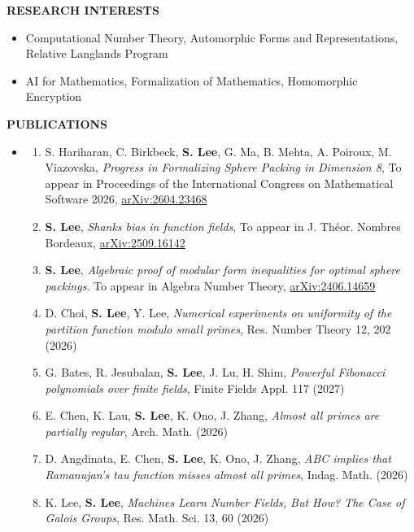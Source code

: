 \documentclass[letterpaper,11pt]{article}
\newcommand{\resheading}[1]{%
  \par\addvspace{10pt}%
  {\sffamily\bfseries\large\color{accent}\MakeUppercase{#1}}\par\nobreak
  \vspace{2pt}{\color{accent!35}\hrule height 0.7pt}\par\nobreak\vspace{5pt}}
\newcommand{\ressubsection}[1]{%
  \par\addvspace{4pt}{\sffamily\bfseries\color{muted}#1}\par\nobreak\vspace{2pt}}
\begin{document}
\resheading{Research Interests}
\begin{itemize}
\item Computational Number Theory, Automorphic Forms and Representations, Relative Langlands Program
\item AI for Mathematics, Formalization of Mathematics, Homomorphic Encryption
\end{itemize}

\resheading{Publications}
\begin{itemize}
	\item[] \ressubsection{Mathematics}
	\begin{enumerate}
		\item S. Hariharan, C. Birkbeck, \textbf{S. Lee}, G. Ma, B. Mehta, A. Poiroux, M. Viazovska, \emph{Progress in Formalizing Sphere Packing in Dimension 8}, To appear in Proceedings of the International Congress on Mathematical Software 2026, \href{http://arxiv.org/abs/2604.23468}{arXiv:2604.23468}
		\item \textbf{S. Lee}, \emph{Shanks bias in function fields}, To appear in J. Th\'eor. Nombres Bordeaux, \href{https://arxiv.org/abs/2509.16142}{arXiv:2509.16142}
		\item \textbf{S. Lee}, \emph{Algebraic proof of modular form inequalities for optimal sphere packings}. To appear in Algebra Number Theory, \href{https://arxiv.org/abs/2406.14659}{arXiv:2406.14659}
		\item D. Choi, \textbf{S. Lee}, Y. Lee, \emph{Numerical experiments on uniformity of the partition function modulo small primes}, Res. Number Theory 12, 202 (2026)
		\item G. Bates, R. Jesubalan, \textbf{S. Lee}, J. Lu, H. Shim, \emph{Powerful Fibonacci polynomials over finite fields}, Finite Fields Appl. 117 (2027)
		\item E. Chen, K. Lau, \textbf{S. Lee}, K. Ono, J. Zhang, \emph{Almost all primes are partially regular}, Arch. Math. (2026)
		\item D. Angdinata, E. Chen, \textbf{S. Lee}, K. Ono, J. Zhang, \emph{ABC implies that Ramanujan's tau function misses almost all primes}, Indag. Math. (2026)
		\item K. Lee, \textbf{S. Lee}, \emph{Machines Learn Number Fields, But How? The Case of Galois Groups}, Res. Math. Sci. 13, 60 (2026)

\end{enumerate}
\end{itemize}
\end{document}
